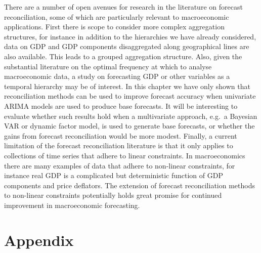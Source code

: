 \documentclass[graybox]{svmult}
\begin{document}
There are a number of open avenues for research in the literature on forecast reconciliation, some of which are particularly relevant to macroeconomic applications. First there is scope to consider more complex aggregation structures, for instance in addition to the hierarchies we have already considered, data on GDP and GDP components disaggregated along geographical lines are also available. This leads to a grouped aggregation structure. Also, given the substantial literature on the optimal frequency at which to analyse macroeconomic data, a study on forecasting GDP or other variables as a temporal hierarchy may be of interest. In this chapter we have only shown that reconciliation methods can be used to improve forecast accuracy when univariate ARIMA models are used to produce base forecasts. It will be interesting to evaluate whether such results hold when a multivariate approach, e.g.\ a Bayesian VAR or dynamic factor model, is used to generate base forecasts, or whether the gains from forecast reconciliation would be more modest. Finally, a current limitation of the forecast reconciliation literature is that it only applies to collections of time series that adhere to linear constraints. In macroeconomics there are many examples of data that adhere to non-linear constraints, for instance real GDP is a complicated but deterministic function of GDP components and price deflators. The extension of forecast reconciliation methods to non-linear constraints potentially holds great promise for continued improvement in macroeconomic forecasting.

\clearpage






\clearpage

\section*{Appendix}
\end{document}
